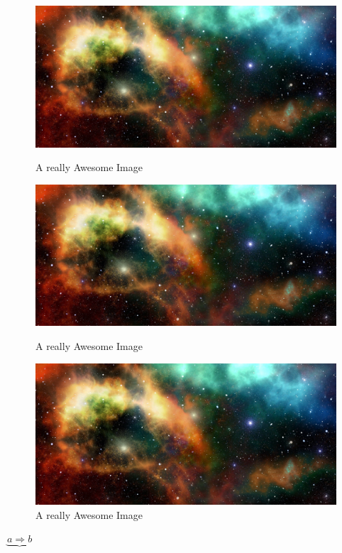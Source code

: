 \documentclass[a4paper,11pt]{ctexart}
\begin{document}
\begin{figure}[!htb]
  \includegraphics[width=\linewidth]{Rplot}
  \caption{A really Awesome Image}\label{fig:awesome_image1}
\endminipage\hfill
{}
  \includegraphics[width=\linewidth]{Rplot}
  \caption{A really Awesome Image}\label{fig:awesome_image2}
\endminipage\hfill
{}%
  \includegraphics[width=\linewidth]{Rplot}
  \caption{A really Awesome Image}\label{fig:awesome_image3}
\endminipage
\end{figure}


$\underbrace{a\Rightarrow b}$
\end{document}

